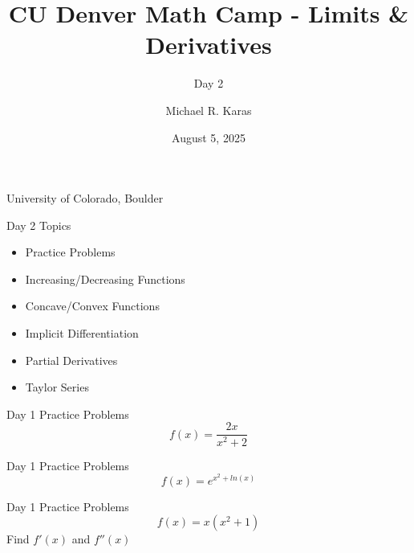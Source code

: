 \documentclass[aspectratio=169]{beamer}
\title{CU Denver Math Camp - Limits \& Derivatives}
\subtitle{Day 2}
\date{August 5, 2025}
\author{Michael R. Karas}
\begin{document}
\begin{frame}
\maketitle

{\footnotesize University of Colorado, Boulder}
\end{frame}

\begin{frame}{Day 2 Topics}\label{main1}

\begin{itemize}
	\begin{itemize}
		\item Practice Problems		
		\item Increasing/Decreasing Functions
		\item Concave/Convex Functions
		\item Implicit Differentiation
		\item Partial Derivatives
		\item Taylor Series
	\end{itemize}
\end{itemize}
\end{frame}

\begin{frame}{Day 1 Practice Problems}\label{main1}
	\vspace{-4cm}
    \[
    f(x) = \frac{2x}{x^{2}+2}
    \]
\end{frame}

\begin{frame}{Day 1 Practice Problems}\label{main1}
	\vspace{-4cm}
    \[
    f(x) = e^{x^{2} + ln(x)}
    \]
\end{frame}

\begin{frame}{Day 1 Practice Problems}\label{main1}
	\vspace{-4cm}
    \[
    f(x) = x(x^{2} + 1)
    \]
    Find \( f'(x) \) and \( f''(x) \)
\end{frame}
\end{document}
